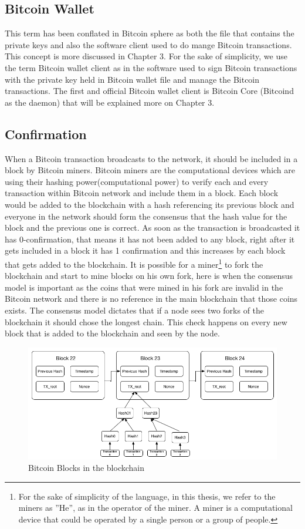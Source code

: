\subsection{Bitcoin Wallet}
This term has been conflated in Bitcoin sphere as both the file that contains the private keys and also the software client used to do mange Bitcoin transactions. This concept is more discussed in Chapter 3. For the sake of simplicity, we use the term Bitcoin wallet client as in the software used to sign Bitcoin transactions with the private key held in Bitcoin wallet file and manage the Bitcoin transactions.
The first and official Bitcoin wallet client is Bitcoin Core (Bitcoind as the daemon) that will be explained more on Chapter 3.


\subsection{Confirmation}
When a Bitcoin transaction broadcasts to the network, it should be included in a block by Bitcoin miners. Bitcoin miners are the computational devices which are using their hashing power(computational power) to verify each and every transaction within Bitcoin network and include them in a block. Each block would be added to the blockchain with a hash referencing its previous block and everyone in the network should form the consensus that the hash value for the block and the previous one is correct. As soon as the transaction is broadcasted it has 0-confirmation, that means it has not been added to any block, right after it gets included in a block it has 1 confirmation and this increases by each block that gets added to the blockchain.
It is possible for a miner\footnote{For the sake of simplicity of the language, in this thesis, we refer to the miners as ''He'', as in the operator of the miner. A miner is a computational device that could be operated by a single person or a group of people.} to fork the blockchain and start to mine blocks on his own fork, here is when the consensus model is important as the coins that were mined in his fork are invalid in the Bitcoin network and there is no reference in the main blockchain that those coins exists. The consensus model dictates that if a node sees two forks of the blockchain it should chose the longest chain. This check happens on every new block that is added to the blockchain and seen by the node.

\begin{figure}
\centering
\includegraphics[width=\linewidth]{fig/Bitcoinblocks.png}
  \caption{Bitcoin Blocks in the blockchain ~\cite{Nak08}}
\label{fig:Bitcoinblocks}
\end{figure}

